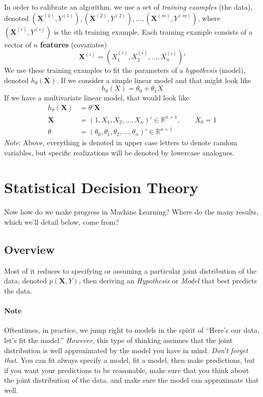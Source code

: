 \documentclass[12pt]{article}
\begin{document}
In order to calibrate an algorithm, we use a set of
\emph{training examples} (the data), denoted
$(\mathbf{X}^{(1)}, Y^{(1)}),
(\mathbf{X}^{(2)}, Y^{(2)}), \ldots, (\mathbf{X}^{(m)}, Y^{(m)})$,
where $(\mathbf{X}^{(i)}, Y^{(i)})$ is the $i$th training example. Each
training example consists of a vector of $n$ \textbf{features}
(covariates)
   \[ \mathbf{X}^{(i)} = \left(X_1^{(i)},X_2^{(i)},\ldots,
      X_n^{(i)}\right)'\]
We use these training examples to fit the parameters of
a \emph{hypothesis} (model), denoted $h_\theta(\mathbf{X})$. If we
consider a simple linear model and that might look like
   \[ h_\theta(X) = \theta_0 + \theta_1 X\]
If we have a multivariate linear model, that would look like
\begin{align*}
   h_\theta(\mathbf{X}) &= \theta' \mathbf{X}\\
   \mathbf{X} &= \left(1, X_1, X_2, \ldots, X_n\right)' \in \mathbb{R}^{n+1},
      \qquad X_0 = 1\\
   \theta &= \left(\theta_0, \theta_1, \theta_2, \ldots, \theta_n\right)'
   \in \mathbb{R}^{n+1}
\end{align*}
{\sl Note}: Above, everything is denoted in upper case letters
to denote random variables, but specific realizations will be
denoted by lowercase analogues.


\section{Statistical Decision Theory}

Now how do we make progress in Machine Learning? Where do
the many results, which we'll detail below, come from?

\subsection{Overview}

Most of it reduces to specifying or assuming a particular
joint distribution of the data, denoted $p(\mathbf{X}, Y)$,
then deriving an \emph{Hypothesis} or \emph{Model} that
best predicts the data.

\paragraph{Note} Oftentimes, in practice, we
jump right to models in the spirit of ``Here's our data,
let's fit the model.'' \emph{However}, this type of thinking
assumes that the joint distribution is well approximated
by the model you have in mind. \emph{Don't forget that.}
You can fit always specify a model, fit a model, then
make predictions, but if you want your predictions to be
reasonable, make sure that you think about the joint
distribution of the data, and make sure the model can
approximate that well.
\end{document}
